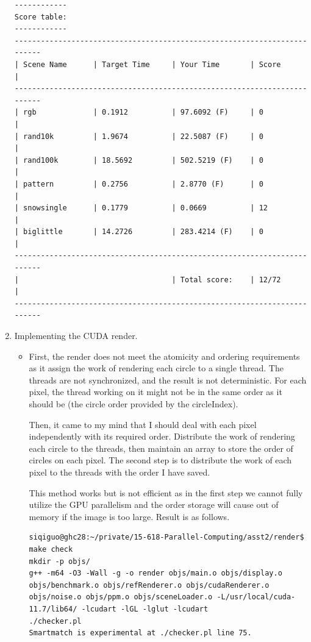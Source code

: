 \documentclass[letterpaper,11pt]{exam}
\begin{document}
\begin{questions}
\begin{enumerate}[label=\roman*.]
\begin{lstlisting}[]
------------
Score table:
------------
-------------------------------------------------------------------------
| Scene Name      | Target Time     | Your Time       | Score           |
-------------------------------------------------------------------------
| rgb             | 0.1912          | 97.6092 (F)     | 0               |
| rand10k         | 1.9674          | 22.5087 (F)     | 0               |
| rand100k        | 18.5692         | 502.5219 (F)    | 0               |
| pattern         | 0.2756          | 2.8770 (F)      | 0               |
| snowsingle      | 0.1779          | 0.0669          | 12              |
| biglittle       | 14.2726         | 283.4214 (F)    | 0               |
-------------------------------------------------------------------------
|                                   | Total score:    | 12/72           |
-------------------------------------------------------------------------
            \end{lstlisting}


        \item Implementing the CUDA render.

              \begin{itemize}
                  \item First, the render does not meet the atomicity and ordering requirements as it assign the work of rendering each circle to a single thread.
                        The threads are not synchronized, and the result is not deterministic.
                        For each pixel, the thread working on it might not be in the same order as it should be (the circle order provided by the circleIndex).

                        Then, it came to my mind that I should deal with each pixel independently with its required order.
                        Distribute the work of rendering each circle to the threads, then maintain an array to store the order of circles on each pixel.
                        The second step is to distribute the work of each pixel to the threads with the order I have saved.

                        This method works but is not efficient as in the first step we cannot fully utilize the GPU parallelism and the order storage will cause out of memory if the image is too large. Result is as follows.

                        \begin{lstlisting}
siqiguo@ghc28:~/private/15-618-Parallel-Computing/asst2/render$ make check
mkdir -p objs/
g++ -m64 -O3 -Wall -g -o render objs/main.o objs/display.o objs/benchmark.o objs/refRenderer.o objs/cudaRenderer.o objs/noise.o objs/ppm.o objs/sceneLoader.o -L/usr/local/cuda-11.7/lib64/ -lcudart -lGL -lglut -lcudart 
./checker.pl
Smartmatch is experimental at ./checker.pl line 75.


\end{lstlisting}
\end{itemize}
\end{enumerate}
\end{questions}
\end{document}
